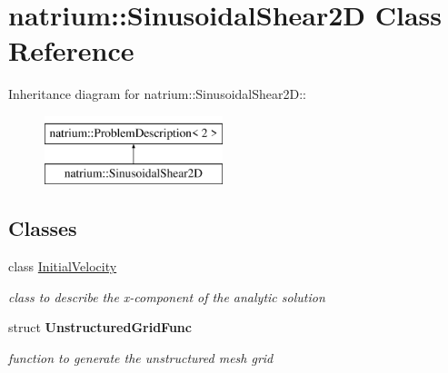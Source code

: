 \hypertarget{classnatrium_1_1SinusoidalShear2D}{
\section{natrium::SinusoidalShear2D Class Reference}
\label{classnatrium_1_1SinusoidalShear2D}
}
Inheritance diagram for natrium::SinusoidalShear2D::\begin{figure}[H]
\begin{center}
\leavevmode
\includegraphics[height=2cm]{classnatrium_1_1SinusoidalShear2D}
\end{center}
\end{figure}
\subsection*{Classes}
\begin{DoxyCompactItemize}
\item 
class \hyperlink{classnatrium_1_1SinusoidalShear2D_1_1InitialVelocity}{InitialVelocity}
\begin{DoxyCompactList}\small\item\em class to describe the x-\/component of the analytic solution \item\end{DoxyCompactList}\item 
struct {\bfseries UnstructuredGridFunc}
\begin{DoxyCompactList}\small\item\em function to generate the unstructured mesh grid \item\end{DoxyCompactList}\end{DoxyCompactItemize}
